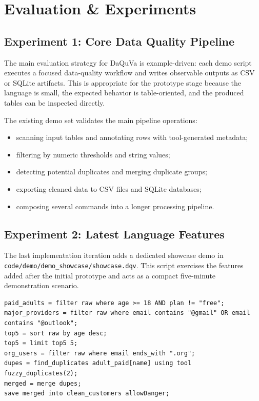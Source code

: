 \chapter{Evaluation \& Experiments}

\section{Experiment 1: Core Data Quality Pipeline}

The main evaluation strategy for DaQuVa is example-driven: each demo script
executes a focused data-quality workflow and writes observable outputs as CSV
or SQLite artifacts. This is appropriate for the prototype stage because the
language is small, the expected behavior is table-oriented, and the produced
tables can be inspected directly.

The existing demo set validates the main pipeline operations:

\begin{itemize}[label=-, noitemsep]
      \item scanning input tables and annotating rows with tool-generated
          metadata;
    \item filtering by numeric thresholds and string values;
    \item detecting potential duplicates and merging duplicate groups;
    \item exporting cleaned data to CSV files and SQLite databases;
    \item composing several commands into a longer processing pipeline.
\end{itemize}

\section{Experiment 2: Latest Language Features}

The last implementation iteration adds a dedicated showcase demo in
\texttt{code/demo/demo\_showcase/showcase.dqv}. This script exercises the
features added after the initial prototype and acts as a compact five-minute
demonstration scenario.

\begin{lstlisting}[style=dsl]
paid_adults = filter raw where age >= 18 AND plan != "free";
major_providers = filter raw where email contains "@gmail" OR email contains "@outlook";
top5 = sort raw by age desc;
top5 = limit top5 5;
org_users = filter raw where email ends_with ".org";
dupes = find_duplicates adult_paid[name] using tool fuzzy_duplicates(2);
merged = merge dupes;
save merged into clean_customers allowDanger;
\end{lstlisting}

